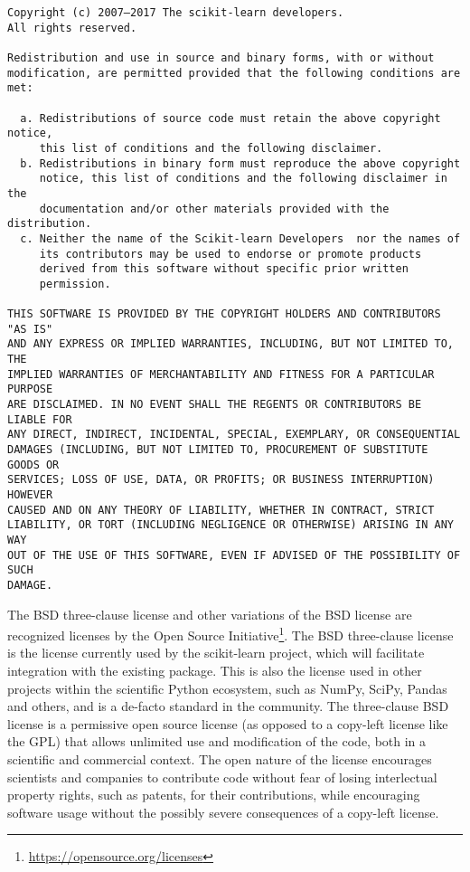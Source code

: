 \documentclass[11pt,letterpaper]{article}
\begin{document}
\begin{verbatim}
Copyright (c) 2007–2017 The scikit-learn developers.
All rights reserved.

Redistribution and use in source and binary forms, with or without
modification, are permitted provided that the following conditions are met:

  a. Redistributions of source code must retain the above copyright notice,
     this list of conditions and the following disclaimer.
  b. Redistributions in binary form must reproduce the above copyright
     notice, this list of conditions and the following disclaimer in the
     documentation and/or other materials provided with the distribution.
  c. Neither the name of the Scikit-learn Developers  nor the names of
     its contributors may be used to endorse or promote products
     derived from this software without specific prior written
     permission. 

THIS SOFTWARE IS PROVIDED BY THE COPYRIGHT HOLDERS AND CONTRIBUTORS "AS IS"
AND ANY EXPRESS OR IMPLIED WARRANTIES, INCLUDING, BUT NOT LIMITED TO, THE
IMPLIED WARRANTIES OF MERCHANTABILITY AND FITNESS FOR A PARTICULAR PURPOSE
ARE DISCLAIMED. IN NO EVENT SHALL THE REGENTS OR CONTRIBUTORS BE LIABLE FOR
ANY DIRECT, INDIRECT, INCIDENTAL, SPECIAL, EXEMPLARY, OR CONSEQUENTIAL
DAMAGES (INCLUDING, BUT NOT LIMITED TO, PROCUREMENT OF SUBSTITUTE GOODS OR
SERVICES; LOSS OF USE, DATA, OR PROFITS; OR BUSINESS INTERRUPTION) HOWEVER
CAUSED AND ON ANY THEORY OF LIABILITY, WHETHER IN CONTRACT, STRICT
LIABILITY, OR TORT (INCLUDING NEGLIGENCE OR OTHERWISE) ARISING IN ANY WAY
OUT OF THE USE OF THIS SOFTWARE, EVEN IF ADVISED OF THE POSSIBILITY OF SUCH
DAMAGE.
\end{verbatim}


The BSD three-clause license and other variations of the BSD license
are recognized licenses by the Open Source
Initiative\footnote{\url{https://opensource.org/licenses}}.
The BSD three-clause license is the license currently used by the scikit-learn
project, which will facilitate integration with the existing package.
This is also the license used in other projects within the scientific Python
ecosystem, such as NumPy, SciPy, Pandas and others, and is a de-facto
standard in the community. The three-clause BSD
license is a permissive open source license (as opposed to a copy-left license
like the GPL) that allows unlimited use and modification of the code, both in a
scientific and commercial context. The open nature of the license encourages scientists
and companies to contribute code without fear of losing interlectual property rights,
such as patents, for their contributions, while encouraging software usage without
the possibly severe consequences of a copy-left license.
\end{document}
